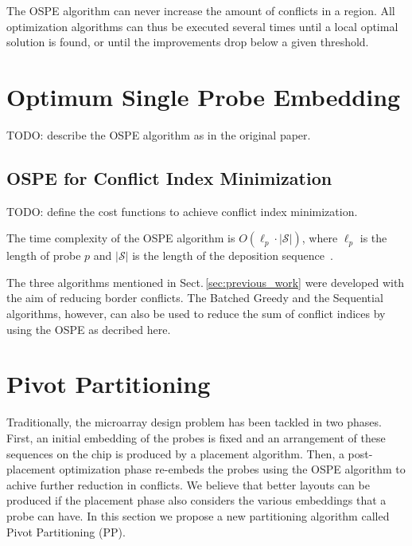 \documentclass[runningheads]{llncs}
\begin{document}
The OSPE algorithm can never increase the amount of conflicts in a region.
All optimization algorithms can thus be executed several times until
a local optimal solution is found, or until the improvements drop below a given threshold.

\section{Optimum Single Probe Embedding}
\label{sec:ospe}

TODO: describe the OSPE algorithm as in the original paper.

\subsection{OSPE for Conflict Index Minimization}
\label{sec:ospe_ci}

TODO: define the cost functions to achieve conflict index minimization.

The time complexity of the OSPE algorithm is $O(\ell_p \cdot |\mathcal{S}|)$,
where $\ell_p$ is the length of probe $p$ and $|\mathcal{S}|$ is the length of
the deposition sequence~\cite{KAHNG02}.

The three algorithms mentioned in Sect.\,\ref{sec:previous_work} were developed with
the aim of reducing border conflicts. The Batched Greedy and the Sequential algorithms,
however, can also be used to reduce the sum of conflict indices by using the OSPE as
decribed here.

\section{Pivot Partitioning}
\label{sec:pivotpart}

Traditionally, the microarray design problem has been tackled in two phases. First,
an initial embedding of the probes is fixed and an arrangement of these sequences
on the chip is produced by a placement algorithm. Then, a post-placement optimization
phase re-embeds the probes using the OSPE algorithm to achive further reduction in
conflicts. We believe that better layouts can be produced if the placement phase
also considers
the various embeddings that a probe can have. In this section we propose a new
partitioning algorithm called Pivot Partitioning (PP).
\end{document}
